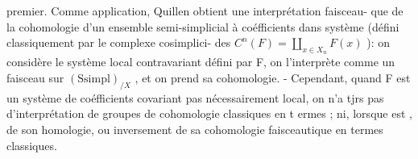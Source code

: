 
premier. Comme application, Quillen obtient une interprétation faisceau-%
que de la cohomologie d'un ensemble semi-simplicial à coéfficients dans
système    (défini classiquement par le complexe cosimplici-
\margin{$\Pi$ !} des $C^n(F) = \coprod_{x \in X_n} F(x)$ ): on considère le système local contravariant
défini par F, on l'interprète comme un faisceau sur  $(\mathrm{Ssimpl})_{/X}$ , et on
prend sa cohomologie. - Cependant, quand F est un système de coéfficients
\margin{[ (bracket in the left margin, from this line to ``faisceautique en termes classiques.'')} covariant pas nécessairement local, on n'a tjrs pas d'interprétation de
 groupes de cohomologie classiques en t ermes ; ni, lorsque
est , de son homologie, ou inversement de sa cohomologie
faisceautique en termes classiques.


